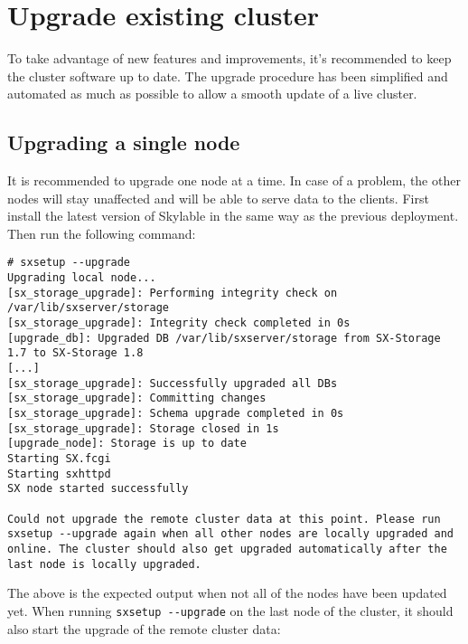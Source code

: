 \section{Upgrade existing cluster}
To take advantage of new features and improvements, it's recommended to
keep the cluster software up to date. The upgrade procedure has been
simplified and automated as much as possible to allow a smooth update
of a live cluster.
\subsection{Upgrading a single node}
It is recommended to upgrade one node at a time. In case of a problem, the
other nodes will stay unaffected and will be able to serve data to the
clients.
First install the latest version of Skylable \SX in the same way as the
previous deployment. Then run the following command:
\begin{lstlisting}
# sxsetup --upgrade
Upgrading local node...
[sx_storage_upgrade]: Performing integrity check on /var/lib/sxserver/storage
[sx_storage_upgrade]: Integrity check completed in 0s
[upgrade_db]: Upgraded DB /var/lib/sxserver/storage from SX-Storage 1.7 to SX-Storage 1.8
[...]
[sx_storage_upgrade]: Successfully upgraded all DBs
[sx_storage_upgrade]: Committing changes
[sx_storage_upgrade]: Schema upgrade completed in 0s
[sx_storage_upgrade]: Storage closed in 1s
[upgrade_node]: Storage is up to date
Starting SX.fcgi
Starting sxhttpd
SX node started successfully

Could not upgrade the remote cluster data at this point. Please run
sxsetup --upgrade again when all other nodes are locally upgraded and
online. The cluster should also get upgraded automatically after the
last node is locally upgraded.
\end{lstlisting}
The above is the expected output when not all of the nodes have been
updated yet. When running \verb+sxsetup --upgrade+ on the last node
of the cluster, it should also start the upgrade of the remote cluster
data:
